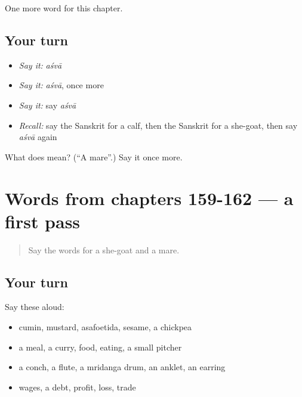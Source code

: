 \begin{grammarlens}[title={What you've built}]
One more word for this chapter.
\end{grammarlens}

\subsection*{Your turn}
\begin{itemize}
\raggedright
  \item \emph{Say it:} \emph{aśvā}
  \item \emph{Say it:} \emph{aśvā}, once more
  \item \emph{Say it:} say \emph{aśvā}
  \item \emph{Recall:} say the Sanskrit for a calf, then the Sanskrit for a she-goat, then say \emph{aśvā} again
\end{itemize}

\begin{tcolorbox}[breakable,colback=teal!4,colframe=teal!35!black,title={Before you move on}]
What does  mean? (\textquotedblleft{}A mare\textquotedblright{}.) Say it once more.
\end{tcolorbox}
\section[(dialogue)]{Words from chapters 159-162 — a first pass}

\label{lesson:SA-R167-first-pass-words-from-chapters-159-162}



\begin{quote}
Say the words for a she-goat and a mare.
\end{quote}

\subsection*{Your turn}
Say these aloud:

\begin{itemize}
\raggedright
  \item cumin, mustard, asafoetida, sesame, a chickpea
  \item a meal, a curry, food, eating, a small pitcher
  \item a conch, a flute, a mridanga drum, an anklet, an earring
  \item wages, a debt, profit, loss, trade
\end{itemize}

